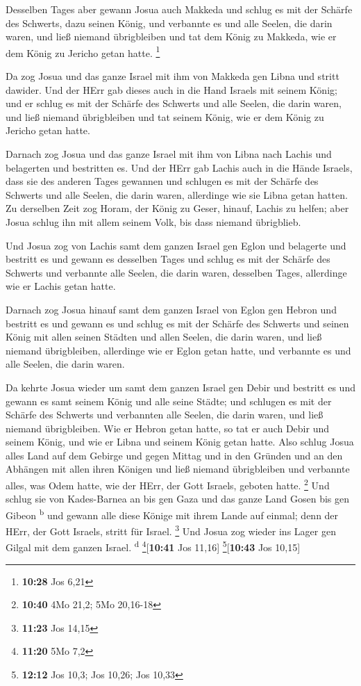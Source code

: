  Desselben Tages aber gewann Josua auch Makkeda und
schlug es mit der Schärfe des Schwerts, dazu seinen König, und verbannte
es und alle Seelen, die darin waren, und ließ niemand übrigbleiben und
tat dem König zu Makkeda, wie er dem König zu Jericho getan hatte.
\footnote{\textbf{10:28} Jos 6,21}

 Da zog Josua und das ganze Israel mit ihm von Makkeda
gen Libna und stritt dawider.  Und der HErr gab dieses
auch in die Hand Israels mit seinem König; und er schlug es mit der
Schärfe des Schwerts und alle Seelen, die darin waren, und ließ niemand
übrigbleiben und tat seinem König, wie er dem König zu Jericho getan
hatte.

 Darnach zog Josua und das ganze Israel mit ihm von Libna
nach Lachis und belagerten und bestritten es.  Und der
HErr gab Lachis auch in die Hände Israels, dass sie des anderen Tages
gewannen und schlugen es mit der Schärfe des Schwerts und alle Seelen,
die darin waren, allerdinge wie sie Libna getan hatten. 
Zu derselben Zeit zog Horam, der König zu Geser, hinauf, Lachis zu
helfen; aber Josua schlug ihn mit allem seinem Volk, bis dass niemand
übrigblieb.

 Und Josua zog von Lachis samt dem ganzen Israel gen
Eglon und belagerte und bestritt es  und gewann es
desselben Tages und schlug es mit der Schärfe des Schwerts und verbannte
alle Seelen, die darin waren, desselben Tages, allerdinge wie er Lachis
getan hatte.

 Darnach zog Josua hinauf samt dem ganzen Israel von
Eglon gen Hebron und bestritt es  und gewann es und
schlug es mit der Schärfe des Schwerts und seinen König mit allen seinen
Städten und allen Seelen, die darin waren, und ließ niemand
übrigbleiben, allerdinge wie er Eglon getan hatte, und verbannte es und
alle Seelen, die darin waren.

 Da kehrte Josua wieder um samt dem ganzen Israel gen
Debir und bestritt es  und gewann es samt seinem König
und alle seine Städte; und schlugen es mit der Schärfe des Schwerts und
verbannten alle Seelen, die darin waren, und ließ niemand übrigbleiben.
Wie er Hebron getan hatte, so tat er auch Debir und seinem König, und
wie er Libna und seinem König getan hatte.  Also schlug
Josua alles Land auf dem Gebirge und gegen Mittag und in den Gründen und
an den Abhängen mit allen ihren Königen und ließ niemand übrigbleiben
und verbannte alles, was Odem hatte, wie der HErr, der Gott Israels,
geboten hatte. \footnote{\textbf{10:40} 4Mo 21,2; 5Mo 20,16-18}
 Und schlug sie von Kades-Barnea an bis gen Gaza und das
ganze Land Gosen bis gen Gibeon \textsuperscript{b}  und
gewann alle diese Könige mit ihrem Lande auf einmal; denn der HErr, der
Gott Israels, stritt für Israel. \footnote{\textbf{11:23} Jos 14,15}
 Und Josua zog wieder ins Lager gen Gilgal mit dem ganzen
Israel. \textsuperscript{d} \footnote{\textbf{11:20} 5Mo 7,2}{[}\textbf{10:41}
Jos 11,16{]} \footnote{\textbf{12:12} Jos 10,3; Jos 10,26; Jos 10,33}{[}\textbf{10:43}
Jos 10,15{]}

